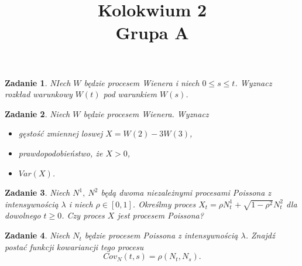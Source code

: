 \documentclass{mwart}
\title{Kolokwium 2\\Grupa A}
\newtheorem{zd}{Zadanie}
\begin{document}

\maketitle
\begin{zd}
NIech $W$ będzie procesem Wienera i niech $0 \leq s \leq t$. Wyznacz rozkład warunkowy $W(t)$ pod warunkiem $W(s)$.
\end{zd}

\begin{zd}
Niech $W$ będzie procesem Wienera. Wyznacz
\begin{itemize}
\item gęstość zmiennej loswej $X = W(2) - 3W(3)$,
\item prawdopodobieństwo, że $X > 0$,
\item $Var(X)$.
\end{itemize}
\end{zd}

\begin{zd}
Niech $N^1,\ N^2$ będą dwoma niezależnymi procesami Poissona z intensywnością $\lambda$ i niech $\rho \in [0, 1]$. Określmy proces $X_t = \rho N_t^1 + \sqrt{1 - \rho^2}N^2_t$ dla dowolnego $t\geq 0$. Czy proces $X$ jest procesem Poissona?
\end{zd}

\begin{zd}
Niech $N_t$ będzie procesem Poissona z intensywnością $\lambda$. Znajdź postać funkcji  kowariancji tego procesu
\begin{displaymath}
	Cov_N(t,s) = \rho\left(N_t, N_s\right).
\end{displaymath}
\end{zd}
\end{document}
